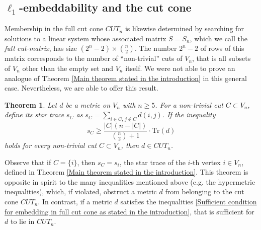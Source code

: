 \documentclass[12pt]{amsart}
\newtheorem{theorem}{Theorem}
\numberwithin{theorem}{section}
\theoremstyle{remark}
\begin{document}
\subsection{$\ell_1$-embeddability and the cut cone}
Membership in the full cut cone $CUT_n$ is likewise determined by searching for solutions %
to a linear system  whose associated matrix $S = S_n$, which we call the {\em full cut-matrix}, has size $\left( 2^{n}-2\right)\times {n\choose 2}$. The number $2^n-2$ of rows of this matrix corresponds to the number of ``non-trivial'' cuts of $V_n $, that is all subsets of $V_n$ other than the empty set and $V_n$ itself. We were not able to prove an analogue of Theorem \ref{Main theorem stated in the introduction} in this general case. Nevertheless, we are able to offer this result. 
\vskip3mm
\begin{theorem} \label{Second main theorem for the full cut matrix as stated in the introduction}
Let $d$ be a metric on $V_n$ with $n\ge 5$. For a non-trivial cut $C\subset V_n$, define its {\em star trace $s_C$} as $s_C =  \sum_{i\in C,\, j\notin C}d(i,j)$. If the inequality  
\begin{equation} \label{Sufficient condition for embedding in full cut cone as stated in the introduction}
	s_C \ge \frac{|C|(n-|C|)}{{n\choose 2} + 1} \cdot \text{Tr}(d)	
\end{equation} 
holds for every non-trivial cut $C\subset V_n$, then $d\in CUT_n$. 
\end{theorem}
Observe that if $C=\{i\}$, then $s_C=s_i$, the star trace of the $i$-th vertex $i\in V_n$, defined in Theorem \ref{Main theorem stated in the introduction}. This theorem is opposite in spirit to the many inequalities mentioned above (e.g. the hypermetric inequalities), which, if violated, obstruct a  metric $d$ from belonging to the cut cone $CUT_n$. In contrast, if a metric $d$ satisfies the inequalities \eqref{Sufficient condition for embedding in full cut cone as stated in the introduction}, that is sufficient for $d$ to lie in $CUT_n$. %
\end{document}
